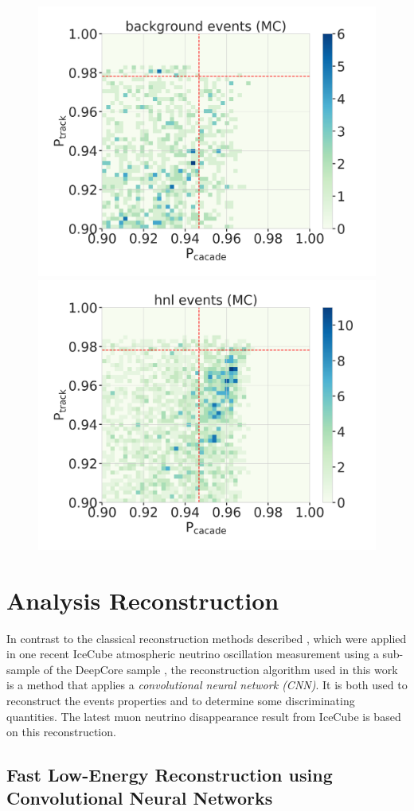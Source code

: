 \begin{figure}[h]
	\centering
    \includegraphics[width=0.49\linewidth]{figures/results/190607/classification/cascade_vs_track_class_prob_background_full_stats.png}
    \includegraphics[width=0.49\linewidth]{figures/results/190607/classification/cascade_vs_track_class_prob_hnl_full_stats.png}
    \caption[]{}
\end{figure}


\section{Analysis Reconstruction} 

In contrast to the classical reconstruction methods described , which were applied in one recent IceCube atmospheric neutrino oscillation measurement using a sub-sample of the DeepCore sample , the reconstruction algorithm used in this work is a method that applies a \textit{convolutional neural network (CNN)}. It is both used to reconstruct the events properties and to determine some discriminating quantities. The latest muon neutrino disappearance result from IceCube  is based on this reconstruction.


\subsection{Fast Low-Energy Reconstruction using Convolutional Neural Networks} 

